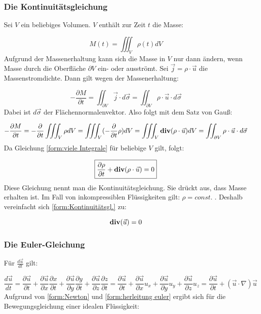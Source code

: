 \subsubsection{Die Kontinuitätsgleichung}
Sei $ V $ ein beliebiges Volumen. $V$ enthält zur Zeit $t$ die Masse:

\begin{equation}
M(t) = \iiint_V \rho (t) dV
\end{equation}
Aufgrund der Massenerhaltung kann sich die Masse in $V$ nur dann ändern, wenn Masse durch die Oberfläche $ \partial V $ ein- oder ausströmt. Sei $ \vec{j} = \rho \cdot \vec{u} $ die Massenstromdichte. Dann gilt wegen der Massenerhaltung:

\begin{equation}
-\frac{\partial M}{\partial t} = \iint_{\partial V} \vec{j} \cdot d \vec{\sigma} = \iint_{\partial V} \rho \cdot \vec{u} \cdot d \vec{\sigma}
\end{equation}
Dabei ist $ d \vec{\sigma} $ der Flächennormalenvektor. Also folgt mit dem Satz von Gauß:

\begin{equation}
-\frac{\partial M}{\partial t} = -\frac{\partial}{\partial t} \iiint_V \rho dV = \iiint_V (-\frac{\partial}{\partial t} \rho) dV = \iiint_V {\bf div}(\rho \cdot \vec{u})dV = \iint_{\partial V} \rho \cdot \vec{u} \cdot d \vec{\sigma}
\label{form:viele Integrale}
\end{equation}
Da Gleichung \ref{form:viele Integrale} für beliebige $V$ gilt, folgt:

\begin{equation}
\boxed{\frac{\partial \rho}{\partial t} + {\bf div}(\rho \cdot \vec{u}) = 0}
\label{form:Kontinuitätsgl.}
\end{equation}
Diese Gleichung nennt man die Kontinuitätsgleichung. Sie drückt aus, dass Masse erhalten ist. Im Fall von inkompressiblen Flüssigkeiten gilt: $ \rho = const. $ . Deshalb vereinfacht sich \ref{form:Kontinuitätsgl.} zu:

\begin{equation}
{\bf div}(\vec{u}) = 0
\end{equation}

\subsubsection{Die Euler-Gleichung}
Für $ \frac{d \vec{u}}{dt} $ gilt:

\begin{equation}
\frac{d \vec{u}}{dt} = \frac{\partial \vec{u}}{\partial t} + \frac{\partial \vec{u}}{\partial x} \frac{\partial x}{\partial t} + \frac{\partial \vec{u}}{\partial y} \frac{\partial y}{\partial t} + \frac{\partial \vec{u}}{\partial z} \frac{\partial z}{\partial t} = \frac{\partial \vec{u}}{\partial t} + \frac{\partial \vec{u}}{\partial x} u_x + \frac{\partial \vec{u}}{\partial y} u_y + \frac{\partial \vec{u}}{\partial z} u_z = \frac{\partial \vec{u}}{\partial t} + (\vec{u} \cdot \nabla) \vec{u}
\label{form:herleitung euler}
\end{equation}
Aufgrund von \ref{form:Newton} und \ref{form:herleitung euler} ergibt sich für die Bewegungsgleichung einer idealen Flüssigkeit:

